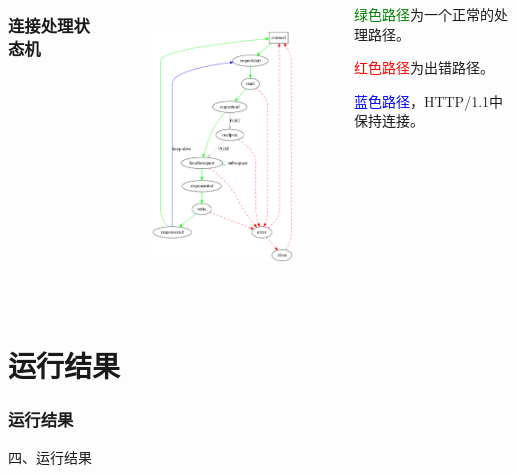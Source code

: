 \documentclass[10pt,dvipdfm]{beamer}
\begin{document}
\begin{frame}
	\begin{columns}
	\frametitle{连接处理状态机}
	
	\begin{column}{0.6\textwidth}
		\begin{figure}[htbp]
		\centering
		\includegraphics[height=7.5cm, width=6cm]{pics/state.eps}
		\end{figure}
	\end{column}
	
	\begin{column}{0.3\textwidth}
		\begin{block}{}
			\textcolor{green}{绿色路径}为一个正常的处理路径。\\
		\end{block}
		\begin{block}{}
			\textcolor{red}{红色路径}为出错路径。\\
		\end{block}
		\begin{block}{}	
			\textcolor{blue}{蓝色路径}，HTTP/1.1中保持连接。
		\end{block}
	\end{column}
	
	\end{columns}
	
\end{frame}

\section{运行结果}
\begin{frame}
	\frametitle{运行结果}
	\begin{center}
	{\Large
		四、运行结果
	}
	\end{center}
\end{frame}
\end{document}
